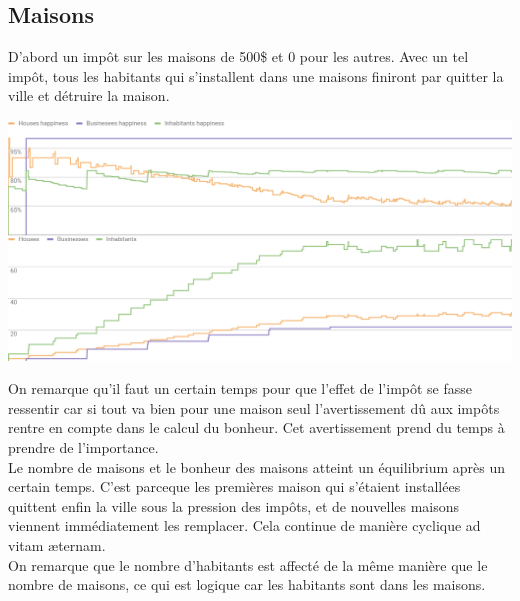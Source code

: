 \documentclass[11pt]{report}
\begin{document}
\subsection{Maisons}
D'abord un impôt sur les maisons de 500\$ et 0 pour les autres. Avec un tel impôt, tous les habitants qui s'installent dans une maisons finiront par quitter la ville et détruire la maison.
\begin{center}
	\includegraphics[width=\textwidth]{houses_taxes}
\end{center}
On remarque qu'il faut un certain temps pour que l'effet de l'impôt se fasse ressentir car si tout va bien pour une maison seul l'avertissement dû aux impôts rentre en compte dans le calcul du bonheur. Cet avertissement prend du temps à prendre de l'importance.\\
Le nombre de maisons et le bonheur des maisons atteint un équilibrium après un certain temps. C'est parceque les premières maison qui s'étaient installées quittent enfin la ville sous la pression des impôts, et de nouvelles maisons viennent immédiatement les remplacer. Cela continue de manière cyclique ad vitam æternam.\\
On remarque que le nombre d'habitants est affecté de la même manière que le nombre de maisons, ce qui est logique car les habitants sont dans les maisons.

\newpage
\end{document}

